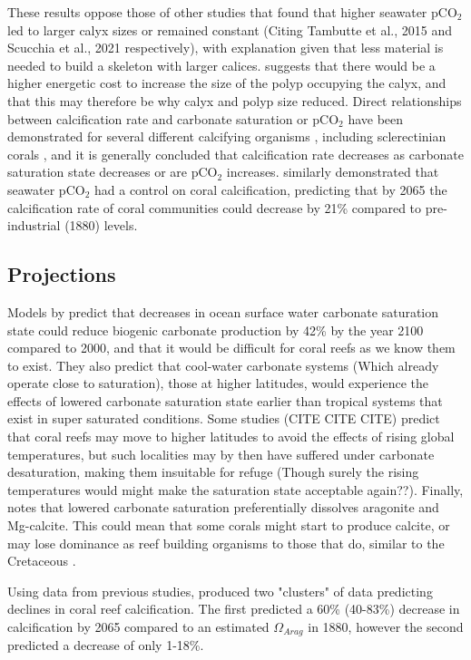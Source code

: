 \documentclass[11pt,a4paper]{article}
\begin{document}
These results oppose those of other studies that found that higher seawater pCO$_{2}$ led to larger calyx sizes or remained constant (Citing Tambutte et al., 2015 and Scucchia et al., 2021 respectively), with explanation given that less material is needed to build a skeleton with larger calices. \cite{Allison2022} suggests that there would be a higher energetic cost to increase the size of the polyp occupying the calyx, and that this may therefore be why calyx and polyp size reduced. Direct relationships between calcification rate and carbonate saturation or pCO$_{2}$ have been demonstrated for several different calcifying organisms \citep{Sciandra2003,Bijma2002}, including sclerectinian corals \citep{Reynaud2003}, and it is generally concluded that calcification rate decreases as carbonate saturation state decreases or are pCO$_{2}$ increases. \cite{Leclercq2000} similarly demonstrated that seawater pCO$_{2}$ had a control on coral calcification, predicting that by 2065 the calcification rate of coral communities could decrease by 21\% compared to pre-industrial (1880) levels. 

\subsection{Projections}
Models by \cite{Andersson2005} predict that decreases in ocean surface water carbonate saturation state could reduce biogenic carbonate production by 42\% by the year 2100 compared to 2000, and that it would be difficult for coral reefs as we know them to exist. They also predict that cool-water carbonate systems (Which already operate close to saturation), those at higher latitudes, would experience the effects of lowered carbonate saturation state earlier than tropical systems that exist in super saturated conditions. Some studies (CITE CITE CITE) predict that coral reefs may move to higher latitudes to avoid the effects of rising global temperatures, but such localities may by then have suffered under carbonate desaturation, making them insuitable for refuge (Though surely the rising temperatures would might make the saturation state acceptable again??). Finally, \cite{Andersson2005} notes that lowered carbonate saturation preferentially dissolves aragonite and Mg-calcite. This could mean that some corals might start to produce calcite, or may lose dominance as reef building organisms to those that do, similar to the Cretaceous \citep{Ries2006}.

Using data from previous studies, \cite{Langdon2005} produced two "clusters" of data predicting declines in coral reef calcification. The first predicted a 60\% (40-83\%) decrease in calcification by 2065 compared to an estimated $\Omega_{Arag}$ in 1880, however the second predicted a decrease of only 1-18\%. %
\end{document}

